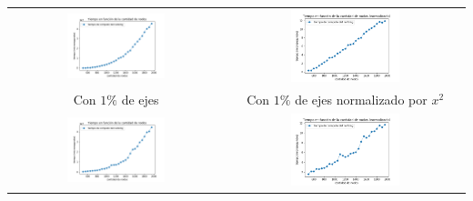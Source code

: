          \noindent{} \begin{minipage}{\textwidth}
                \begin{center}
                    \vspace{1em}

                    \begin{tabular}{cc}
                        \includegraphics[width=0.475\textwidth]{img/tiempo_nodos_prop_500-2000_solo_e100.png}
                       & 
                        \includegraphics[width=0.475\textwidth]{img/tiempo_nodos_prop_500-2000-normalizado-e100.png}								\\
                        Con $1\%$ de ejes & Con $1\%$ de ejes normalizado por $x^{2}$ \\
                        \includegraphics[width=0.475\textwidth]{img/tiempo_nodos_prop_500-2000_solo_e10.png} 
       & \includegraphics[width=0.475\textwidth]{img/tiempo_nodos_prop_500-2000-normalizado-e10.png} \\

\end{tabular}
\end{center}
\end{minipage}
